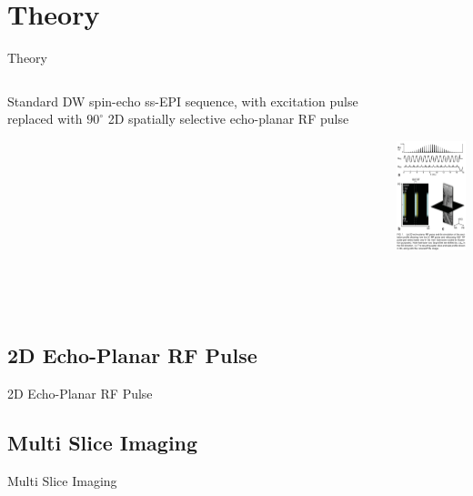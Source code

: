 \documentclass{beamer}
\begin{document}
\section{Theory}

\begin{frame}{Theory}
\begin{columns}[T]
	\begin{column}[T]{5cm}
		Standard DW spin-echo ss-EPI sequence, with excitation pulse replaced with $90^{\circ}$ 2D spatially selective echo-planar RF pulse
	\end{column}
	\begin{column}[T]{5cm}
		\includegraphics[height=6cm]{SpineDWIfig1}
	\end{column}
\end{columns}
\end{frame}

\subsection{2D Echo-Planar RF Pulse}

\begin{frame}{2D Echo-Planar RF Pulse}

\end{frame}

\subsection{Multi Slice Imaging}

\begin{frame}{Multi Slice Imaging}

\end{frame}

\end{document}
